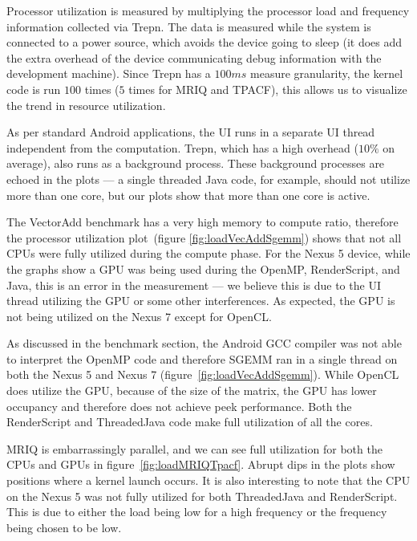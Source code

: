 Processor utilization is measured by multiplying the processor
  load and frequency information collected via Trepn.
The data is measured while the system is connected to a
  power source, which avoids the device going to sleep (it does add the
  extra overhead of the device communicating debug information with the development
  machine).
Since Trepn has a $100ms$ measure granularity, the kernel code is run $100$ times
  ($5$ times for MRIQ and TPACF), this allows us to visualize the trend in resource
  utilization.

As per standard Android applications, the UI runs in a separate UI thread 
  independent from the computation.
Trepn, which has a high overhead ($10\%$ on average), also runs as a background
  process.
These background processes are echoed in
  the plots --- a single threaded Java code, for example, should not utilize more than one core, but our plots show that more than one core is active.


The VectorAdd benchmark has a very high memory to compute ratio, therefore the processor utilization
  plot~(figure \ref{fig:loadVecAddSgemm}) shows that not all CPUs 
  were fully utilized during the compute phase.
For the Nexus 5 device, while the graphs show a GPU was being used during the OpenMP,
  RenderScript, and Java, this is an error in the measurement --- we believe this is 
  due to the UI thread utilizing the GPU or some other interferences.
As expected, the GPU is not being utilized on the Nexus 7 except for OpenCL.

As discussed in the benchmark section, the Android GCC compiler was not able 
  to interpret the OpenMP  code and therefore SGEMM ran in a single thread
  on both the Nexus 5 and Nexus 7 (figure~\ref{fig:loadVecAddSgemm}).
While OpenCL does utilize the GPU, because of the size of the matrix, the GPU has
  lower occupancy and therefore does not achieve peek performance.
Both the RenderScript and ThreadedJava code make full utilization of all the cores.

MRIQ is embarrassingly parallel, and we can see full utilization for both the CPUs and GPUs in figure~\ref{fig:loadMRIQTpacf}.
Abrupt dips in the plots show positions where a kernel launch occurs.
It is also interesting to note that the CPU on the Nexus 5 was not fully utilized for both ThreadedJava and RenderScript.
This is due to either the load being low for a high frequency or the frequency being 
  chosen to be low.

